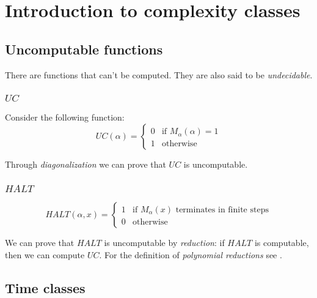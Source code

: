 \section{Introduction to complexity classes}\label{sec:intro_compl_classes}


\subsection{Uncomputable functions}\label{subsec:uncomp_funcs}
    There are functions that can't be computed. They are also said to be \textit{undecidable}.

    \subsubsection{$UC$}\label{subsubsec:uc}
        Consider the following function:
        \begin{equation}\label{eq:uc}
            UC(\alpha) = 
            \begin{cases}
                0 & \text{if } M_\alpha(\alpha) = 1 \\
                1 & \text{otherwise}
            \end{cases}
        \end{equation}

        Through \textit{diagonalization} we can prove that $UC$ is uncomputable.

    \subsubsection{$HALT$}\label{subsubsec:halt}
        \begin{equation}\label{eq:uc}
            HALT(\alpha, x) = 
            \begin{cases}
                1 & \text{if } M_\alpha(x) \text{ terminates in finite steps} \\
                0 & \text{otherwise}
            \end{cases}
        \end{equation}

        We can prove that $HALT$ is uncomputable by \textit{reduction}: if $HALT$ is computable, then we can compute $UC$.
        For the definition of \textit{polynomial reductions} see .


\subsection{Time classes}\label{sec:time_classes}

